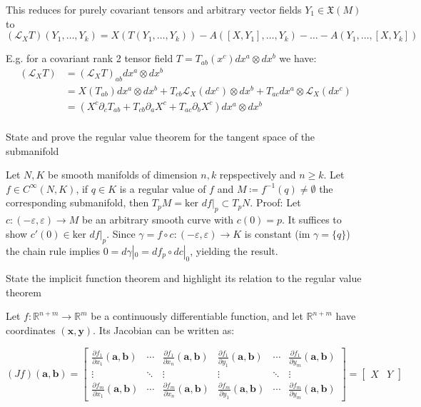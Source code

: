 This reduces for purely covariant tensors and arbitrary vector fields \( Y_1 \in \mathfrak{X}(M) \) to
\( (\mathcal{L}_X T)(Y_1, \dots, Y_k) = X(T(Y_1, \dots, Y_k)) - A([X, Y_1], \dots, Y_k) - \dots - A(Y_1, \dots, [X, Y_k]) \)


E.g. for a covariant rank 2 tensor field \( T = T_{ab}(x^c)dx^a \otimes dx^b \) we have:
\[
\begin{align} 
(\mathcal {L}_X T) &= (\mathcal {L}_X T)_{ab} dx^a\otimes dx^b\\
&= X(T_{ab})dx^a\otimes dx^b + T_{cb} \mathcal{L}_X (dx^c) \otimes dx^b + T_{ac}  dx^a \otimes \mathcal{L}_X (dx^c)\\
&= (X^c \partial_c T_{ab}+T_{cb}\partial_a X^c+T_{ac}\partial_b X^c)dx^a\otimes dx^b\\
\end{align}
\]


State and prove the regular value theorem for the tangent space of the submanifold

Let \( N, K \) be smooth manifolds of dimension \( n,k \) repspectively and \( n \geq k \).
Let \( f \in C^\infty(N, K) \), if \( q \in K \) is a regular value of \( f \) and \( M \coloneqq f^{-1}(q) \neq \emptyset \)
the corresponding submanifold, then \( T_pM = \text{ker } df|_p \subset T_pN \).
Proof:
Let \( c : (-\varepsilon, \varepsilon) \to M \) be an arbitrary smooth curve with \( c(0) = p \).
It suffices to show \( c'(0)\in \text{ker } df|_p \). Since \( \gamma = f \circ c : (-\varepsilon, \varepsilon) \to K \)
is constant (\( \text{im } \gamma = \{q\} \)) the chain rule implies
\( 0 = d\gamma|_0 = df_p \circ dc|_0 \), yielding the result.


State the implicit function theorem and highlight its relation to the regular value theorem

Let \( f: \mathbb{R}^{n+m} \to \mathbb{R}^m \) be a continuously differentiable function, and let \( \mathbb{R}^{n+m} \) have coordinates \( (\textbf{x}, \textbf{y}) \). 
Its Jacobian can be written as: 

\[(Jf)(\mathbf{a},\mathbf{b})
= \left[\begin{array}{ccc|ccc}
 \frac{\partial f_1}{\partial x_1}(\mathbf{a},\mathbf{b}) & \cdots & \frac{\partial f_1}{\partial x_n}(\mathbf{a},\mathbf{b}) &
 \frac{\partial f_1}{\partial y_1}(\mathbf{a},\mathbf{b}) & \cdots & \frac{\partial f_1}{\partial y_m}(\mathbf{a},\mathbf{b}) \\
 \vdots & \ddots & \vdots & \vdots & \ddots & \vdots \\
 \frac{\partial f_m}{\partial x_1}(\mathbf{a},\mathbf{b}) & \cdots & \frac{\partial f_m}{\partial x_n}(\mathbf{a},\mathbf{b}) &
 \frac{\partial f_m}{\partial y_1}(\mathbf{a},\mathbf{b}) & \cdots & \frac{\partial f_m}{\partial y_m}(\mathbf{a},\mathbf{b})
\end{array}\right]
= \left[\begin{array}{c|c} X & Y \end{array}\right]\]

